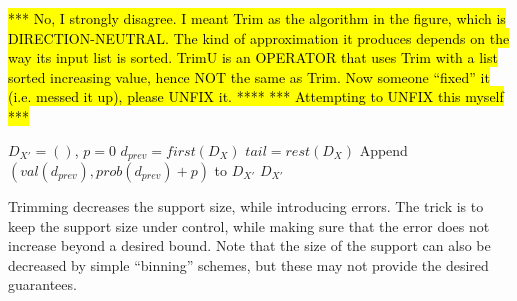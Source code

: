 \documentclass[review]{elsarticle}
\DeclareMathOperator{\support}{support}
\DeclareMathOperator{\Trim}{Trim}
\begin{document}

\hl{*** No, I strongly disagree. I meant Trim as the algorithm in the figure,
which is DIRECTION-NEUTRAL. The kind of approximation it produces depends
on the way its input list is sorted. TrimU is an OPERATOR that uses Trim
with a list sorted increasing value, hence NOT the same as Trim.
Now someone "`fixed"' it (i.e. messed it up), please UNFIX it. ****
*** Attempting to UNFIX this myself ***}



\begin{algorithm}
  \DontPrintSemicolon
  { 
             $D_{X'}=()$, $p=0$ \;	  
  		$d_{prev} = first(D_X)$\;
                $tail = rest(D_X)$ \;
       		 Append $(val(d_{prev}), prob(d_{prev})+p)$ to  $D_{X'}$\;
  \Return $D_{X'}$}
     
\caption{$\Trim$($D_X$,$\varepsilon$)  }
\label{alg:Trim}
\end{algorithm}

Trimming decreases the support size, while introducing errors. The trick is
to keep the support size under control, while making sure that the error does
not increase beyond a desired bound.
Note that the size of the support can also be
 decreased by simple ``binning'' 
schemes, but these may not provide the desired guarantees.
\end{document}
